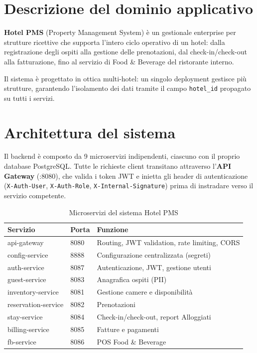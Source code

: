 ﻿\documentclass[a4paper,12pt]{report}
\begin{document}
\section{Descrizione del dominio applicativo}

\textbf{Hotel PMS} (Property Management System) è un gestionale enterprise per strutture
ricettive che supporta l'intero ciclo operativo di un hotel: dalla registrazione degli ospiti
alla gestione delle prenotazioni, dal check-in/check-out alla fatturazione, fino al servizio
di Food \& Beverage del ristorante interno.

Il sistema è progettato in ottica multi-hotel: un singolo deployment gestisce più strutture,
garantendo l'isolamento dei dati tramite il campo \texttt{hotel\_id} propagato su tutti i servizi.

\section{Architettura del sistema}

Il backend è composto da 9 microservizi indipendenti, ciascuno con il proprio database PostgreSQL.
Tutte le richieste client transitano attraverso l'\textbf{API Gateway} (:8080), che valida i token JWT
e inietta gli header di autenticazione (\texttt{X-Auth-User}, \texttt{X-Auth-Role},
\texttt{X-Internal-Signature}) prima di instradare verso il servizio competente.

\begin{table}[H]
\centering
\begin{tabularx}{\textwidth}{l l X}
\toprule
\textbf{Servizio} & \textbf{Porta} & \textbf{Funzione} \\
\midrule
api-gateway & 8080 & Routing, JWT validation, rate limiting, CORS \\
config-service & 8888 & Configurazione centralizzata (segreti) \\
auth-service & 8087 & Autenticazione, JWT, gestione utenti \\
guest-service & 8083 & Anagrafica ospiti (PII) \\
inventory-service & 8081 & Gestione camere e disponibilità \\
reservation-service & 8082 & Prenotazioni \\
stay-service & 8084 & Check-in/check-out, report Alloggiati \\
billing-service & 8085 & Fatture e pagamenti \\
fb-service & 8086 & POS Food \& Beverage \\
\bottomrule
\end{tabularx}
\caption{Microservizi del sistema Hotel PMS}
\label{tab:services}
\end{table}
\end{document}
